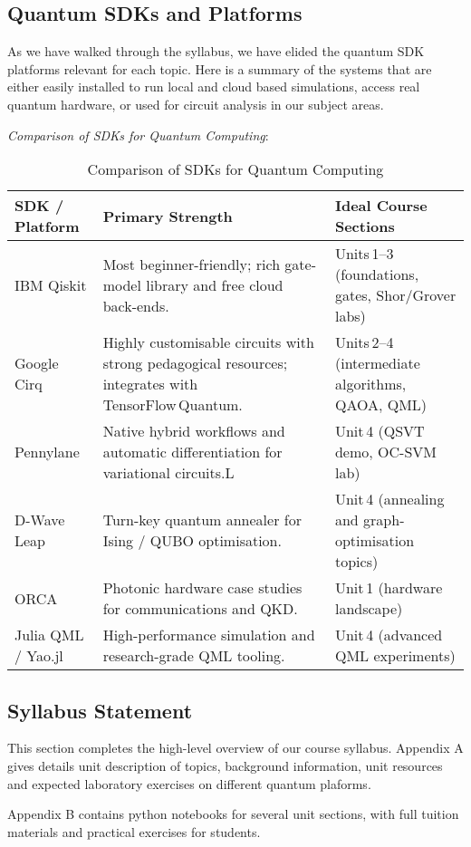 \subsection{Quantum SDKs and Platforms}

As we have walked through the syllabus, we have elided the quantum SDK platforms relevant for each topic.
Here is a summary of the systems that are either easily installed to run local and cloud based simulations, 
access real quantum hardware, or used for circuit analysis in our subject areas.

\emph{Comparison of SDKs for Quantum Computing}:
\begin{table}[ht]
	\centering
	\begin{tabular}{|p{2.8cm}|p{7cm}|p{4cm}|}
		\hline
		\textbf{SDK / Platform} & \textbf{Primary Strength} & \textbf{Ideal Course Sections} \\
		\hline
		IBM Qiskit & Most beginner-friendly; rich gate-model library and free cloud back-ends. & Units 1–3 (foundations, gates, Shor/Grover labs) \\
		\hline
		Google Cirq & Highly customisable circuits with strong pedagogical resources; integrates with TensorFlow Quantum. & Units 2–4 (intermediate algorithms, QAOA, QML) \\
		\hline
		Pennylane & Native hybrid workflows and automatic differentiation for variational circuits.L & Unit 4 (QSVT demo, OC-SVM lab) \\
		\hline
		D-Wave Leap & Turn-key quantum annealer for Ising / QUBO optimisation. & Unit 4 (annealing and graph-optimisation topics) \\
		\hline
		ORCA  & Photonic hardware case studies for communications and QKD. & Unit 1 (hardware landscape) \\
		\hline
		Julia QML / Yao.jl & High-performance simulation and research-grade QML tooling. & Unit 4 (advanced QML experiments) \\
		\hline
	\end{tabular}
	\caption{Comparison of SDKs for Quantum Computing}
	\label{tab:quantum_sdk_comparison}
\end{table}

\subsection{Syllabus Statement}

This section completes the high-level overview of our course syllabus. 
Appendix A gives details unit description of topics, background information, unit resources 
and expected laboratory exercises on different quantum plaforms.  

Appendix B contains python notebooks for several unit sections, with full tuition materials 
and practical exercises for students. 
